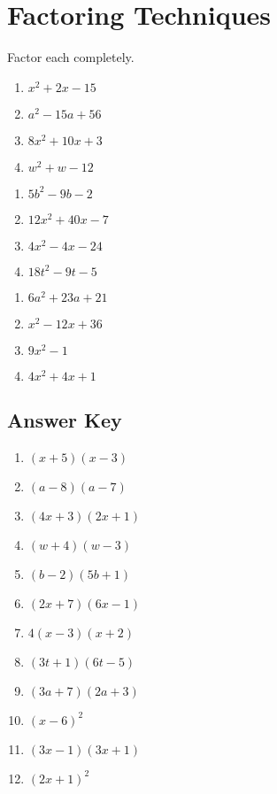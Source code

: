 \chapter{Factoring Techniques}

Factor each completely.

\begin{multicols}{4}
\begin{enumerate}
	\item $x^2 + 2x - 15$
	\item $a^2-15a+56$
	\item $8x^2+10x+3$
	\item $w^2+w-12$
\end{enumerate}	\setcounter{Review}{\value{enumi}}
\end{multicols}
\begin{multicols}{4}
\begin{enumerate}	\setcounter{enumi}{\value{Review}}
	\item $5b^2-9b-2$
	\item $12x^2+40x-7$
	\item $4x^2-4x-24$
    \item $18t^2-9t-5$
\end{enumerate}	\setcounter{Review}{\value{enumi}}
\end{multicols}
\begin{multicols}{4}
\begin{enumerate}	\setcounter{enumi}{\value{Review}}
	\item $6a^2 + 23a + 21$
	\item $x^2-12x+36$
    \item $9x^2-1$
    \item $4x^2+4x+1$
\end{enumerate}	\setcounter{Review}{\value{enumi}}
\end{multicols}

\newpage

\section*{Answer Key}


\begin{enumerate}
	\item $(x+5)(x-3)$
    \item $(a-8)(a-7)$
    \item $(4x+3)(2x+1)$
    \item $(w+4)(w-3)$
	\item $(b-2)(5b+1)$
    \item $(2x+7)(6x-1)$
    \item $4(x-3)(x+2)$
    \item $(3t+1)(6t-5)$
    \item $(3a+7)(2a+3)$
    \item $(x-6)^2$
    \item $(3x-1)(3x+1)$
    \item $(2x+1)^2$
\end{enumerate}